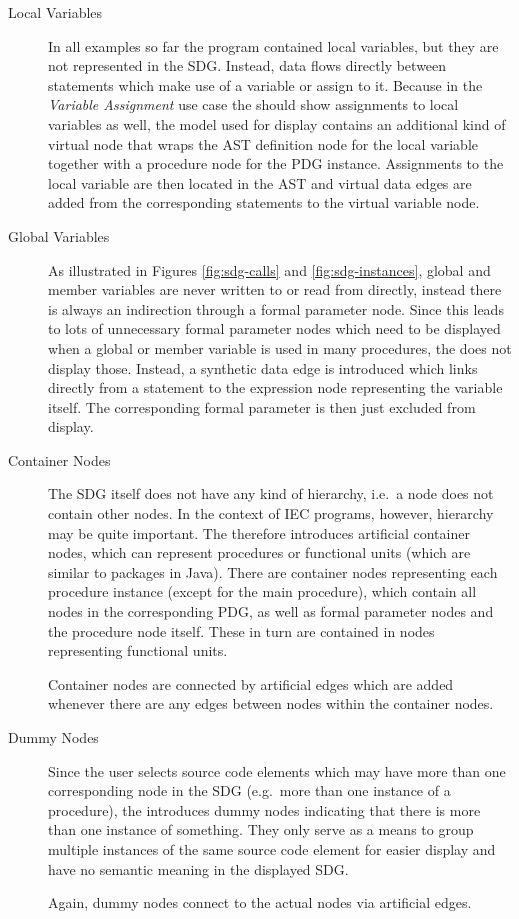 \begin{description}
  \item[Local Variables] In all examples so far the program contained local variables, but they are not represented in 
  the SDG. Instead, data flows directly between statements which make use of a variable or assign to it. Because in the 
  \emph{Variable Assignment} use case the \SB should show assignments to local variables as well, the model used for 
  display contains an additional kind of virtual node that wraps the AST definition node for the local variable 
  together with a procedure node for the PDG instance. Assignments to the local variable are then located in the AST 
  and virtual data edges are added from the corresponding statements to the virtual variable node.

  \item[Global Variables] As illustrated in Figures \ref{fig:sdg-calls} and \ref{fig:sdg-instances}, global and member 
  variables are never written to or read from directly, instead there is always an indirection through a formal 
  parameter node. Since this leads to lots of unnecessary formal parameter nodes which need to be displayed when a 
  global or member variable is used in many procedures, the \SB does not display those. Instead, a synthetic data edge 
  is introduced which links directly from a statement to the expression node representing the variable itself. The 
  corresponding formal parameter is then just excluded from display.
  
  \item[Container Nodes] The SDG itself does not have any kind of hierarchy, i.e.\ a node does not contain other nodes. 
  In the context of IEC programs, however, hierarchy may be quite important. The \SB therefore introduces artificial 
  container nodes, which can represent procedures or functional units (which are similar to packages in Java). There 
  are container nodes representing each procedure instance (except for the main procedure), which contain all nodes in 
  the corresponding PDG, as well as formal parameter nodes and the procedure node itself. These in turn are contained 
  in nodes representing functional units.
  
  Container nodes are connected by artificial edges which are added whenever there are any edges between nodes within 
  the container nodes.
  
  \item[Dummy Nodes] Since the user selects source code elements which may have more than one corresponding node in the 
  SDG (e.g.\ more than one instance of a procedure), the \SB introduces dummy nodes indicating that there is more   
  than one instance of something. They only serve as a means to group multiple instances of the same source code   
  element for easier display and have no semantic meaning in the displayed SDG.
  
  Again, dummy nodes connect to the actual nodes via artificial edges.
\end{description}
